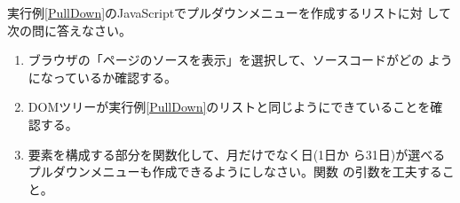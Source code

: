 \begin{Prob}\upshape
実行例\ref{PullDown}のJavaScriptでプルダウンメニューを作成するリストに対
 して次の問に答えなさい。
\begin{enumerate}
 \item \Must ブラウザの「ページのソースを表示」を選択して、ソースコードがどの
       ようになっているか確認する。
 \item \Must DOMツリーが実行例\ref{PullDown}のリストと同じようにできていることを確認する。
 \item {}要素を構成する部分を関数化して、月だけでなく日(1日か
       ら31日)が選べるプルダウンメニューも作成できるようにしなさい。関数
       の引数を工夫すること。
\end{enumerate}
\end{Prob}

